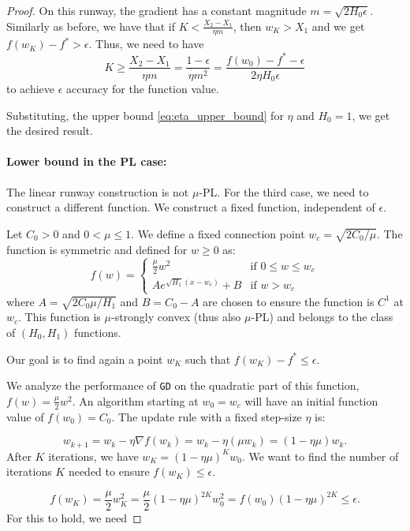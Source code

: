 \documentclass[a4paper,11pt]{article}
\newcommand{\algname}[1]{\texttt{#1}}
\newcommand{\1}{\mathbbm{1}}
\theoremstyle{plain}
\begin{document}
\begin{proof}
On this runway, the gradient has a constant magnitude $m = \sqrt{2H_0\epsilon}$.
Similarly as before, we have that if 
$K < \frac{X_2-X_1}{\eta m}$, then $w_K > X_1$ and we get $f(w_K)-f^*> \epsilon$. Thus, we need to have
\begin{equation*}
    K \geq \frac{X_2-X_1}{\eta m} = \frac{1-\epsilon}{\eta m^2} = \frac{f(w_0)-f^*-\epsilon}{2 \eta H_0 \epsilon}
\end{equation*}
to achieve $\epsilon$ accuracy for the function value.

Substituting, the upper bound \eqref{eq:eta_upper_bound} for $\eta$ and $H_0=1$, we get the desired result.

\paragraph{Lower bound in the PL case: }
The linear runway construction is not $\mu$-PL. For the third case, we need to construct a different function. We construct a fixed function, independent of $\epsilon$.

Let $C_0>0$ and $0< \mu \leq 1$. We define a fixed connection point $w_c = \sqrt{2C_0/\mu}$. The function is symmetric and defined for $w \geq 0$ as:
\begin{equation}
f(w) = 
\begin{cases} 
\frac{\mu}{2}w^2 & \text{if } 0 \leq w \leq w_c \\
A e^{\sqrt{H_1}(x-w_c)} + B & \text{if } w > w_c 
\end{cases}
\end{equation}
where $A = \sqrt{2C_0\mu/H_1}$ and $B = C_0 - A$ are chosen to ensure the function is $C^1$ at $w_c$. This function is $\mu$-strongly convex (thus also $\mu$-PL) and belongs to the class of $(H_0,H_1)$ functions.

Our goal is to find again a point $w_K$ such that $f(w_K) - f^* \leq \epsilon$.

We analyze the performance of \algname{GD} on the quadratic part of this function, $f(w) = \frac{\mu}{2}w^2$. An algorithm starting at $w_0 = w_c$ will have an initial function value of $f(w_0) = C_0$. The update rule with a fixed step-size $\eta$ is:

$$
 w_{k+1} = w_k - \eta \nabla f(w_k) = w_k - \eta (\mu w_k) = (1 - \eta \mu) w_k. 
$$
After $K$ iterations, we have $w_K = (1-\eta\mu)^K w_0$. We want to find the number of iterations $K$ needed to ensure $f(w_K) \leq \epsilon$.

$$
 f(w_K) = \frac{\mu}{2}w_K^2 = \frac{\mu}{2} (1-\eta\mu)^{2K} w_0^2 = f(w_0) (1-\eta\mu)^{2K} \leq \epsilon .
$$
For this to hold, we need


\end{proof}
\end{document}
